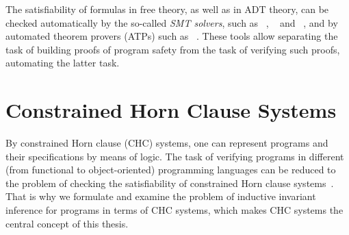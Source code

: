 The satisfiability of formulas in free theory, as well as in ADT theory, can be checked automatically by the so-called \emph{SMT solvers}, such as \zprover{}~\cite{de2008z3}, \cvc{}~\cite{cvc5} and \princess{}~\cite{princess}, and by automated theorem provers (ATPs) such as \vampire{}~\cite{reger2017instantiation}.
These tools allow separating the task of building proofs of program safety from the task of verifying such proofs, automating the latter task.

\section{Constrained Horn Clause Systems}\label{sec:background/Horn}
By constrained Horn clause (CHC) systems, one can represent programs and their specifications by means of logic.
The task of verifying programs in different (from functional to object-oriented) programming languages can be reduced to the problem of checking the satisfiability of constrained Horn clause systems~\cite{Bjorner2015}.
That is why we formulate and examine the problem of inductive invariant inference for programs in terms of CHC systems, which makes CHC systems the central concept of this thesis.

